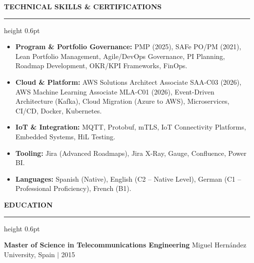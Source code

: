 \documentclass[a4paper,10pt]{article}
\newcommand{\Section}[1]{%
  \vspace{11pt}%
  {\large\bfseries\uppercase{#1}}%
  \vspace{2pt}\par\noindent\hrule height 0.6pt%
  \vspace{5pt}%
}
\begin{document}
\Section{Technical Skills \& Certifications}
\begin{itemize}
\item \textbf{Program \& Portfolio Governance:} PMP (2025), SAFe PO/PM (2021), Lean Portfolio Management, Agile/DevOps Governance, PI Planning, Roadmap Development, OKR/KPI Frameworks, FinOps.
\item \textbf{Cloud \& Platform:} AWS Solutions Architect Associate SAA-C03 (2026), AWS Machine Learning Associate MLA-C01 (2026), Event-Driven Architecture (Kafka), Cloud Migration (Azure to AWS), Microservices, CI/CD, Docker, Kubernetes.
\item \textbf{IoT \& Integration:} MQTT, Protobuf, mTLS, IoT Connectivity Platforms, Embedded Systems, HiL Testing.
\item \textbf{Tooling:} Jira (Advanced Roadmaps), Jira X-Ray, Gauge, Confluence, Power BI.
\item \textbf{Languages:} Spanish (Native), English (C2 -- Native Level), German (C1 -- Professional Proficiency), French (B1).
\end{itemize}

\Section{Education}
\textbf{Master of Science in Telecommunications Engineering} \hfill Miguel Hern\'{a}ndez University, Spain $|$ 2015
\end{document}
